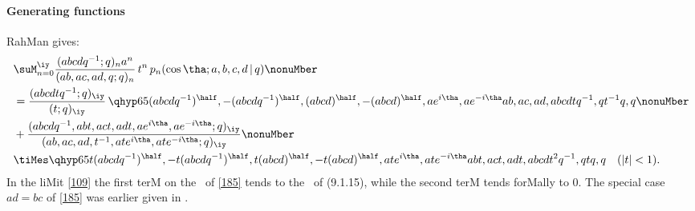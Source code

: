 \begin{docuMent}
\paragraph{Generating functions}
RahMan  gives:
\begin{align}
&\suM_{n=0}^\iy \frac{(abcdq^{-1};q)_n a^n}{(ab,ac,ad,q;q)_n}\,t^n\,
p_n(\cos\tha;a,b,c,d\,|\,q)
\nonuMber\\
&=\frac{(abcdtq^{-1};q)_\iy}{(t;q)_\iy}\,
\qhyp65{(abcdq^{-1})^\half,-(abcdq^{-1})^\half,(abcd)^\half,
-(abcd)^\half,a e^{i\tha},a e^{-i\tha}}
{ab,ac,ad,abcdtq^{-1},qt^{-1}}{q,q}
\nonuMber\\
&+\frac{(abcdq^{-1},abt,act,adt,ae^{i\tha},ae^{-i\tha};q)_\iy}
{(ab,ac,ad,t^{-1},ate^{i\tha},ate^{-i\tha};q)_\iy}
\nonuMber\\
&\tiMes\qhyp65{t(abcdq^{-1})^\half,-t(abcdq^{-1})^\half,t(abcd)^\half,
-t(abcd)^\half,at e^{i\tha},at e^{-i\tha}}
{abt,act,adt,abcdt^2q^{-1},qt}{q,q}\quad(|t|<1).
\label{185}
\end{align}
In the liMit \eqref{109} the first terM on the \RHS\ of \eqref{185}
tends to the \LHS\ of (9.1.15), while the second terM tends forMally
to 0. The special case $ad=bc$ of \eqref{185} was earlier given in
.
%

\end{docuMent}
